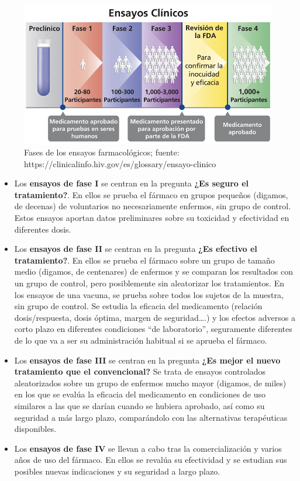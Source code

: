 \documentclass[
]{book}
\theoremstyle{definition}
\theoremstyle{definition}
\theoremstyle{definition}
\theoremstyle{definition}
\theoremstyle{remark}
\begin{document}
\begin{figure}

{\centering \includegraphics[width=0.8\linewidth]{INREMDN_files/figure-html/ensayosclinicos} 

}

\caption{Fases de los ensayos farmacológicos; fuente: https://clinicalinfo.hiv.gov/es/glossary/ensayo-clinico}\label{fig:ensayosclinicos}
\end{figure}

\begin{itemize}
\item
  Los \textbf{ensayos de fase I} se centran en la pregunta \textbf{¿Es seguro el tratamiento?}. En ellos se prueba el fármaco en grupos pequeños (digamos, de decenas) de voluntarios no necesariamente enfermos, sin grupo de control. Estos ensayos aportan datos preliminares sobre su toxicidad y efectividad en diferentes dosis.
\item
  Los \textbf{ensayos de fase II} se centran en la pregunta \textbf{¿Es efectivo el tratamiento?}. En ellos se prueba el fármaco sobre un grupo de tamaño medio (digamos, de centenares) de enfermos y se comparan los resultados con un grupo de control, pero posiblemente sin aleatorizar los tratamientos. En los ensayos de una vacuna, se prueba sobre todos los sujetos de la muestra, sin grupo de control. Se estudia la eficacia del medicamento (relación dosis/respuesta, dosis óptima, margen de seguridad\ldots.) y los efectos adversos a corto plazo en diferentes condiciones ``de laboratorio'', seguramente diferentes de lo que va a ser su administración habitual si se aprueba el fármaco.
\item
  Los \textbf{ensayos de fase III} se centran en la pregunta \textbf{¿Es mejor el nuevo tratamiento que el convencional?} Se trata de ensayos controlados aleatorizados sobre un grupo de enfermos mucho mayor (digamos, de miles) en los que se evalúa la eficacia del medicamento en condiciones de uso similares a las que se darían cuando se hubiera aprobado, así como su seguridad a más largo plazo, comparándolo con las alternativas terapéuticas disponibles.
\item
  Los \textbf{ensayos de fase IV} se llevan a cabo tras la comercialización y varios años de uso del fármaco. En ellos se revalúa su efectividad y se estudian sus posibles nuevas indicaciones y su seguridad a largo plazo.
\end{itemize}
\end{document}
